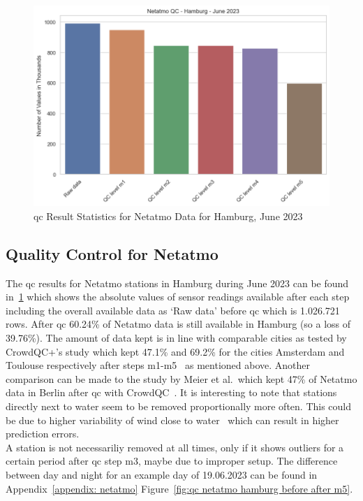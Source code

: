\begin{figure}[htp]
    \centering
    \includegraphics[width=1\textwidth]{images/netatmo_qc_june_23.png}
    \caption{\gls{qc} Result Statistics for Netatmo Data for Hamburg, June 2023}
    \label{fig:qc netatmo june 23}
\end{figure}

\subsection{Quality Control for Netatmo}

The \gls{qc} results for Netatmo stations in Hamburg during June 2023 can be found in~\ref{fig:qc netatmo june 23} which shows the absolute values of sensor readings available after each step including the overall available data as `Raw data' before \gls{qc} which is 1.026.721 rows.
After \gls{qc} 60.24\% of Netatmo data is still available in Hamburg (so a loss of 39.76\%). The amount of data kept is in line with comparable cities as tested by CrowdQC+'s study which kept 47.1\% and 69.2\% for the cities Amsterdam and Toulouse respectively after steps m1-m5~\cite{fenner2021crowdqc+} as mentioned above. Another comparison can be made to the study by Meier et al.\ which kept 47\% of Netatmo data in Berlin after \gls{qc} with CrowdQC~\cite{meier2017crowdsourcing}.
It is interesting to note that stations directly next to water seem to be removed proportionally more often. This could be due to higher variability of wind close to water~\cite{ho2014mapping} which can result in higher prediction errors.\\
A station is not necessariliy removed at all times, only if it shows outliers for a certain period after \gls{qc} step m3, maybe due to improper setup. The difference between day and night for an example day of 19.06.2023 can be found in Appendix~\ref{appendix: netatmo}  Figure~\ref{fig:qc netatmo hamburg before after m5}.

